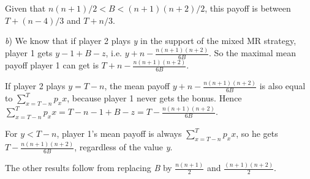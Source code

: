\begin{Article}
\begin{refsection}[Umbhauer]
\begin{appendices}
Given that \(n(n + 1)/2 < B < (n + 1)(n + 2)/2\), this payoff is between
\(T + (n - 4)/3\) and \(T + n/3\).

\emph{b}) We know that if player 2 plays \emph{y} in the support of the mixed MR
  strategy, player 1 gets \(y - 1 + B - z\), i.e.
  \(y + n - \frac{n(n + 1)(n + 2)}{6B}\). So the maximal mean payoff
  player 1 can get is \(T + n - \frac{n(n + 1)(n + 2)}{6B}\).

If player 2 plays \(y = T - n\), the mean payoff
\(y + n - \frac{n(n + 1)(n + 2)}{6B}\) is also equal to
\(\sum_{x = T - n}^{T}{p_{x}x}\), because player 1 never gets the bonus.
Hence
\(\sum_{x = T - n}^{T}{p_{x}x} = T - n - 1 + B - z = T - \frac{n(n + 1)(n + 2)}{6B}\).

For \(y < T - n\), player 1's mean payoff is always
\(\sum_{x = T - n}^{T}{p_{x}x}\), so he gets
\(T - \frac{n(n + 1)(n + 2)}{6B}\), regardless of the value \emph{y}.

The other results follow from replacing \emph{B} by
\(\frac{n(n + 1)}{2}\) and \(\frac{(n + 1)(n + 2)}{2}\).


\end{appendices}

\end{refsection}

\end{Article}
